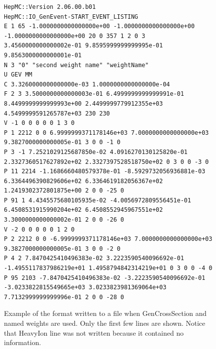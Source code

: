 \documentclass[11pt,letterpaper]{article}
\begin{document}
\begin{figure}[h]
  \begin{center}
{\tiny \begin{verbatim}
HepMC::Version 2.06.00.b01
HepMC::IO_GenEvent-START_EVENT_LISTING
E 1 65 -1.0000000000000000e+00 -1.0000000000000000e+00 -1.0000000000000000e+00 20 0 357 1 2 0 3 3.4560000000000002e-01 9.8595999999999995e-01 9.8563000000000001e-01
N 3 "0" "second weight name" "weightName" 
U GEV MM
C 3.3260000000000000e-03 1.0000000000000000e-04
F 2 3 3.5000000000000003e-01 6.4999999999999991e-01 8.4499999999999993e+00 2.4499999779912355e+03 4.5499999591265787e+03 230 230
V -1 0 0 0 0 0 1 3 0
P 1 2212 0 0 6.9999999371178146e+03 7.0000000000000000e+03 9.3827000000000005e-01 3 0 0 -1 0
P 3 -1 7.2521029125687850e-02 4.0916270130125820e-01 2.3327360517627892e+02 2.3327397528518750e+02 0 3 0 0 -3 0
P 11 2214 -1.1686660480579378e-01 -8.5929732056936881e-03 6.3364496390829606e+02 6.3364619182056367e+02 1.2419302372801875e+00 2 0 0 -25 0
P 91 1 4.4345575680105935e-02 -4.0056972809556451e-01 6.4508531915990204e+02 6.4508552945967551e+02 3.3000000000000002e-01 2 0 0 -26 0
V -2 0 0 0 0 0 1 2 0
P 2 2212 0 0 -6.9999999371178146e+03 7.0000000000000000e+03 9.3827000000000005e-01 3 0 0 -2 0
P 4 2 7.8470425410496383e-02 3.2223590540096692e-01 -1.4955117837986219e+01 1.4958794842314219e+01 0 3 0 0 -4 0
P 95 2103 -7.8470425410496383e-02 -3.2223590540096692e-01 -3.0233822815549665e+03 3.0233823981369064e+03 7.7132999999999996e-01 2 0 0 -28 0
\end{verbatim}}
  \end{center}
  \caption[Example of ascii format]
          {\label{ascii_cross} Example of the format written to a file
	   when GenCrossSection and named weights are used.
           Only the first few lines are shown. 
	   Notice that HeavyIon line was not written because it contained
	   no information. }
\end{figure}
\end{document}
